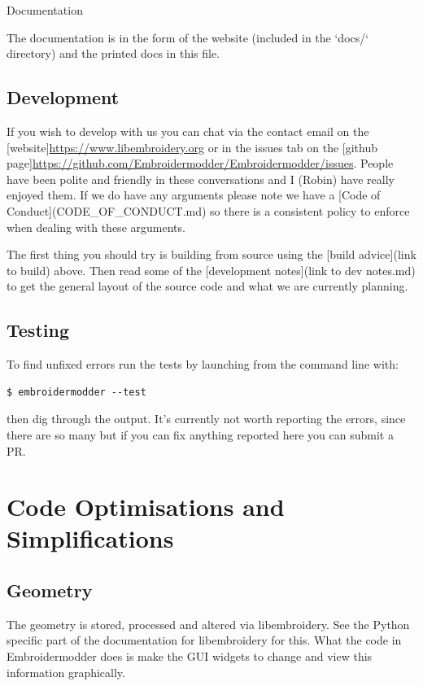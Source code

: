 \documentclass{report}
\begin{document}
Documentation

The documentation is in the form of the website (included in the `docs/`
directory) and the printed docs in this file.

\subsection{Development}

If you wish to develop with us you can chat via the contact email
on the [website]\url{https://www.libembroidery.org} or in the issues tab on the
[github page]\url{https://github.com/Embroidermodder/Embroidermodder/issues}.
People have been polite and friendly in these conversations and I (Robin)
have really enjoyed them.
If we do have any arguments please note we have a
[Code of Conduct](CODE\_OF\_CONDUCT.md) so there is a consistent policy to
enforce when dealing with these arguments.

The first thing you should try is building from source using the [build advice](link to build)
above. Then read some of the [development notes](link to dev notes.md) to get the general
layout of the source code and what we are currently planning.

\subsection{Testing}

To find unfixed errors run the tests by launching from the command line with:

\begin{lstlisting}
$ embroidermodder --test
\end{lstlisting}

then dig through the output. It's currently not worth reporting the errors, since
there are so many but if you can fix anything reported here you can submit a PR.

\section{Code Optimisations and Simplifications}

\subsection{Geometry}

The geometry is stored, processed and altered via libembroidery. See the Python specific part of the documentation for libembroidery for this. What the code in Embroidermodder does is make the GUI widgets to change and view this information graphically.
\end{document}

